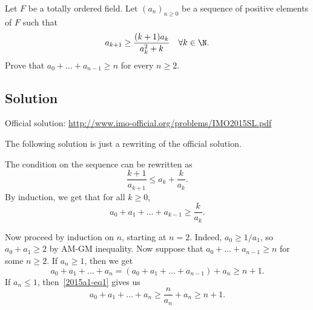 Let $F$ be a totally ordered field.
Let $(a_n)_{n \geq 0}$ be a sequence of positive elements of $F$ such that
\[ a_{k + 1} \geq \dfrac{(k + 1) a_k}{a_k^2 + k} \quad \forall k \in \N. \]
Prove that $a_0 + \ldots + a_{n - 1} \geq n$ for every $n \geq 2$.



\subsection*{Solution}

Official solution: \url{http://www.imo-official.org/problems/IMO2015SL.pdf}

The following solution is just a rewriting of the official solution.

The condition on the sequence can be rewritten as
\[ \frac{k + 1}{a_{k + 1}} \leq a_k + \frac{k}{a_k}. \]
By induction, we get that for all $k \geq 0$,
\[ a_0 + a_1 + \ldots + a_{k - 1} \geq \frac{k}{a_k}. \tag{1}\label{2015a1-eq1} \]

Now proceed by induction on $n$, starting at $n = 2$.
Indeed, $a_0 \geq 1/a_1$, so $a_0 + a_1 \geq 2$ by AM-GM inequality.
Now suppose that $a_0 + \ldots + a_{n - 1} \geq n$ for some $n \geq 2$.
If $a_n \geq 1$, then we get
\[ a_0 + a_1 + \ldots + a_n = (a_0 + a_1 + \ldots + a_{n - 1}) + a_n \geq n + 1. \]
If $a_n \leq 1$, then~\eqref{2015a1-eq1} gives us
\[ a_0 + a_1 + \ldots + a_n \geq \frac{n}{a_n} + a_n \geq n + 1. \]
